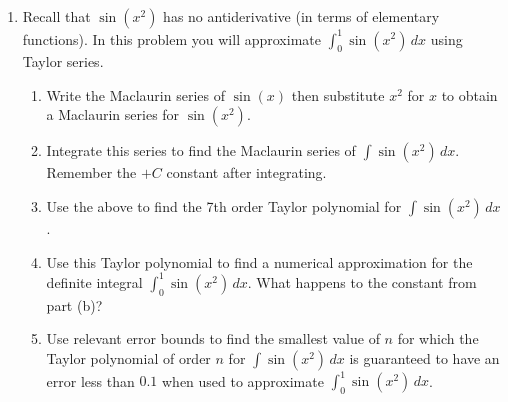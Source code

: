 \documentclass[12pt]{article}
\begin{document}
\begin{enumerate}
\pagebreak
\item Recall that $\sin(x^2)$ has no antiderivative (in terms of elementary functions). In this problem you will approximate $\int_0^1 \sin(x^2) \, dx$ using Taylor series.
\begin{enumerate}
\item Write the Maclaurin series of $\sin(x)$ then substitute $x^2$ for $x$ to obtain a Maclaurin series for $\sin(x^2)$.
\item Integrate this series to find the Maclaurin series of $\int \sin(x^2)  \, dx$.  Remember the $+ C$ constant after integrating.
\item Use the above to find the 7th order Taylor polynomial for $\int \sin(x^2) \, dx$.
\item Use this Taylor polynomial to find a numerical approximation for the definite integral $\int_0^1 \sin(x^2) \, dx$.  What happens to the constant from part (b)?
\item Use relevant error bounds to find the smallest value of $n$ for which the Taylor polynomial of order $n$ for $\int \sin(x^2)\, dx$ is guaranteed to have an error less than $0.1$ when used to approximate $\int_0^1\sin(x^2) \, dx$.
\end{enumerate}

\end{enumerate}
\end{document}
